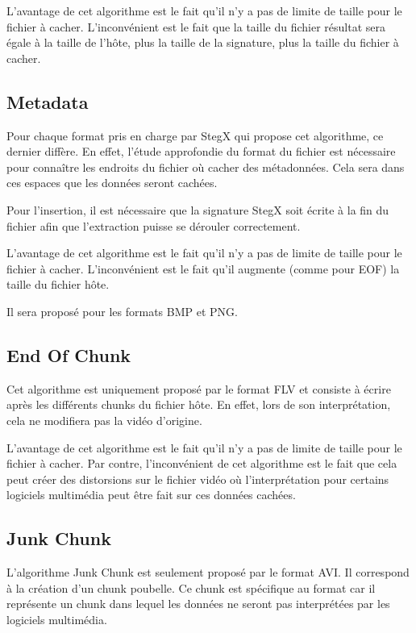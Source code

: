 \documentclass[11pt]{article}
\begin{document}
L'avantage de cet algorithme est le fait qu'il n'y a pas de limite de 
taille pour le fichier à cacher. L'inconvénient est le fait que la taille 
du fichier résultat sera égale à la taille de l'hôte, plus la taille de la 
signature, plus la taille du fichier à cacher. 

\subsection{Metadata}

Pour chaque format pris en charge par StegX qui propose cet algorithme, 
ce dernier diffère. En effet, l'étude approfondie du format du fichier est 
nécessaire pour connaître les endroits du fichier où cacher des métadonnées. 
Cela sera dans ces espaces que les données seront cachées. 

Pour l'insertion, il est nécessaire que la signature StegX soit écrite à 
la fin du fichier afin que l'extraction puisse se dérouler correctement. 

L'avantage de cet algorithme est le fait qu'il n'y a pas de limite de 
taille pour le fichier à cacher. L'inconvénient est le fait qu'il augmente 
(comme pour EOF) la taille du fichier hôte.  

Il sera proposé pour les formats BMP et PNG. 

\subsection{End Of Chunk}

Cet algorithme est uniquement proposé par le format FLV et consiste à 
écrire après les différents chunks du fichier hôte. En effet, lors de 
son interprétation, cela ne modifiera pas la vidéo d'origine. 

L'avantage de cet algorithme est le fait qu'il n'y a pas de limite de 
taille pour le fichier à cacher. Par contre, l'inconvénient de cet algorithme 
est le fait que cela peut créer des distorsions sur le fichier vidéo où 
l'interprétation pour certains logiciels multimédia peut être fait sur ces 
données cachées. 

\subsection{Junk Chunk}

L'algorithme Junk Chunk est seulement proposé par le format AVI. Il correspond 
à la création d'un chunk poubelle. Ce chunk est spécifique au format car il
représente un chunk dans lequel les données ne seront pas interprétées par 
les logiciels multimédia. 
\end{document}
